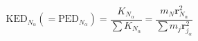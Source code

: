 \documentclass[20pt]{article}
\begin{document}
\baselineskip=40pt

{\Huge

\begin{equation}
\textrm{KED}_{N_{\alpha}} (= \textrm{PED}_{N_{\alpha}}) = 
\frac{K_{N_{\alpha}}}{\sum K_{N_{\alpha}}} = 
\frac{m_N \boldsymbol{r}^2_{N_{\alpha}}}{\sum m_j \boldsymbol{r}^2_{j_{\alpha}}} 
\end{equation}
}
\end{document}
